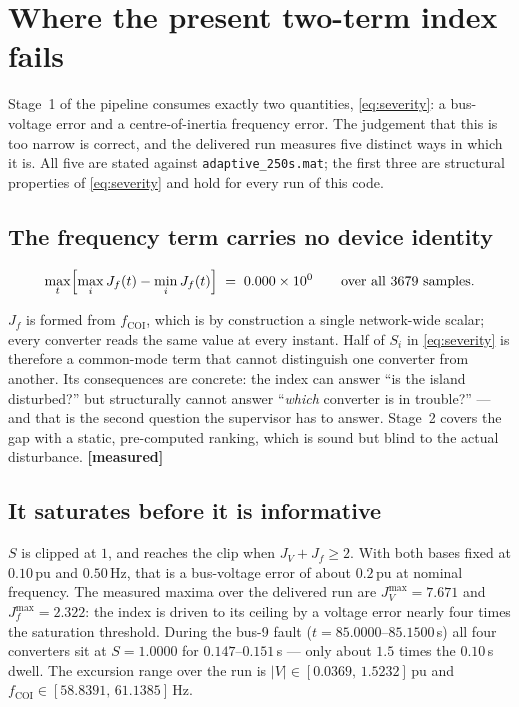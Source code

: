 \documentclass[12pt,a4paper]{article}
\theoremstyle{remark}
\newcommand{\pu}{\,\mathrm{pu}}
\newcommand{\Ssev}{S}
\newcommand{\code}[1]{\texttt{\small #1}}
\newcommand{\measured}{\textcolor{ok}{\textbf{[measured]}}}
\begin{document}
\section{Where the present two-term index fails}\label{sec:indices}

Stage~1 of the pipeline consumes exactly two quantities,
\eqref{eq:severity}: a bus-voltage error and a centre-of-inertia frequency error.
The judgement that this is too narrow is correct, and the delivered run measures
five distinct ways in which it is. All five are stated against
\code{adaptive\_250s.mat}; the first three are structural properties of
\eqref{eq:severity} and hold for every run of this code.

\subsection{The frequency term carries no device identity}

\begin{equation}
\max_t \Bigl[\max_i J_{f}(t) - \min_i J_{f}(t)\Bigr] \;=\; 0.000\times10^{0}
\qquad\text{over all } 3679 \text{ samples}.
\label{eq:commonmode}
\end{equation}

$J_f$ is formed from $f_{\mathrm{COI}}$, which is by construction a single
network-wide scalar; every converter reads the same value at every instant. Half
of $\Ssev_i$ in \eqref{eq:severity} is therefore a common-mode term that cannot
distinguish one converter from another. Its consequences are concrete: the index
can answer ``is the island disturbed?'' but structurally cannot answer
``\emph{which} converter is in trouble?'' --- and that is the second question the
supervisor has to answer. Stage~2 covers the gap with a static, pre-computed
ranking, which is sound but blind to the actual disturbance. \measured

\subsection{It saturates before it is informative}

$\Ssev$ is clipped at $1$, and reaches the clip when
$J_V + J_f \ge 2$. With both bases fixed at $0.10\pu$ and $0.50$\,Hz, that is a
bus-voltage error of about $0.2\pu$ at nominal frequency. The measured maxima
over the delivered run are $J_V^{\max} = 7.671$ and $J_f^{\max} = 2.322$: the
index is driven to its ceiling by a voltage error nearly four times the
saturation threshold. During the bus-9 fault ($t = 85.0000$--$85.1500$\,s) all
four converters sit at $\Ssev = 1.0000$ for $0.147$--$0.151$\,s --- only about
$1.5$ times the $0.10$\,s dwell. The excursion range over the run is
$|V| \in [0.0369,\,1.5232]\pu$ and $f_{\mathrm{COI}} \in [58.8391,\,61.1385]$\,Hz.
\end{document}

